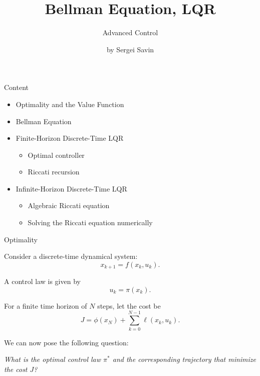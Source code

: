 \documentclass{beamer}
\subtitle{Advanced Control}
\author{by Sergei Savin}
\date{\mydate}
\title{Bellman Equation, LQR}
\begin{document}
\maketitle


\begin{frame}{Content}
	\begin{itemize}
		\item Optimality and the Value Function
		\item Bellman Equation
		\item Finite-Horizon Discrete-Time LQR
		\begin{itemize}
			\item Optimal controller
			\item Riccati recursion
		\end{itemize}
		\item Infinite-Horizon Discrete-Time LQR
		\begin{itemize}
			\item Algebraic Riccati equation
			\item Solving the Riccati equation numerically
		\end{itemize}
	\end{itemize}
\end{frame}



\begin{frame}{Optimality}
	\begin{flushleft}
		
		Consider a discrete-time dynamical system:
		\[
		x_{k+1}=f(x_k,u_k).
		\]
		
		A control law is given by
		\[
		u_k=\pi(x_k).
		\]
		
		For a finite time horizon of $N$ steps, let the cost be
		\[
		J=\phi(x_N)+\sum_{k=0}^{N-1}\ell(x_k,u_k).
		\]
		
		\medskip
		
		We can now pose the following question:
		
		\medskip
		
		\emph{What is the optimal control law $\pi^*$ and the
			corresponding trajectory that minimize the cost $J$?}
		
	\end{flushleft}
\end{frame}
\end{document}
